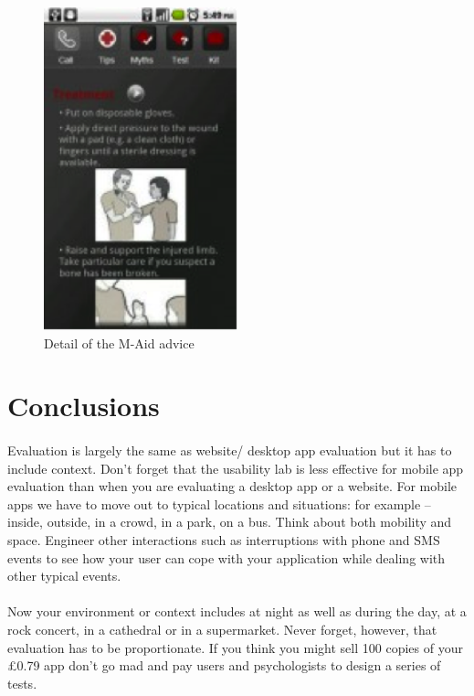 \begin{figure}[H]
\centering
\includegraphics[width=0.5\textwidth]{images/m-aid-2}
\caption{Detail of the M-Aid advice}
\label{fig:m-aid-2}
\end{figure}

\section{Conclusions}
\paragraph{} Evaluation is largely the same as website/ desktop app evaluation but it has to include context. Don’t forget that the usability lab is less effective for mobile app evaluation than when you are evaluating a desktop app or a website. For mobile apps we have to move out to typical locations and situations: for example – inside, outside, in a crowd, in a park, on a bus. Think about both mobility and space. Engineer other interactions such as interruptions with phone and SMS events to see how your user can cope with your application while dealing with other typical events.

\paragraph{} Now your environment or context includes at night as well as during the day, at a rock concert, in a cathedral or in a supermarket. Never forget, however, that evaluation has to be proportionate. If you think you might sell 100 copies of your £0.79 app don’t go mad and pay users and psychologists to design a series of tests.



